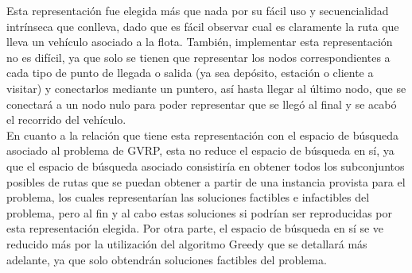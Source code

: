 \documentclass[letter, 10pt]{article}
\begin{document}
Esta representación fue elegida más que nada por su fácil uso y secuencialidad intrínseca que conlleva, dado que es fácil observar cual es claramente la ruta que lleva un vehículo asociado a la flota. También, implementar esta representación no es difícil, ya que solo se tienen que representar los nodos correspondientes a cada tipo de punto de llegada o salida (ya sea depósito, estación o cliente a visitar) y conectarlos mediante un puntero, así hasta llegar al último nodo, que se conectará a un nodo nulo para poder representar que se llegó al final y se acabó el recorrido del vehículo.
\\

En cuanto a la relación que tiene esta representación con el espacio de búsqueda asociado al problema de GVRP, esta no reduce el espacio de búsqueda en sí, ya que el espacio de búsqueda asociado consistiría en obtener todos los subconjuntos posibles de rutas que se puedan obtener a partir de una instancia provista para el problema, los cuales representarían las soluciones factibles e infactibles del problema, pero al fin y al cabo estas soluciones si podrían ser reproducidas por esta representación elegida. Por otra parte, el espacio de búsqueda en sí se ve reducido más por la utilización del algoritmo Greedy que se detallará más adelante, ya que solo obtendrán soluciones factibles del problema.



\end{document}
